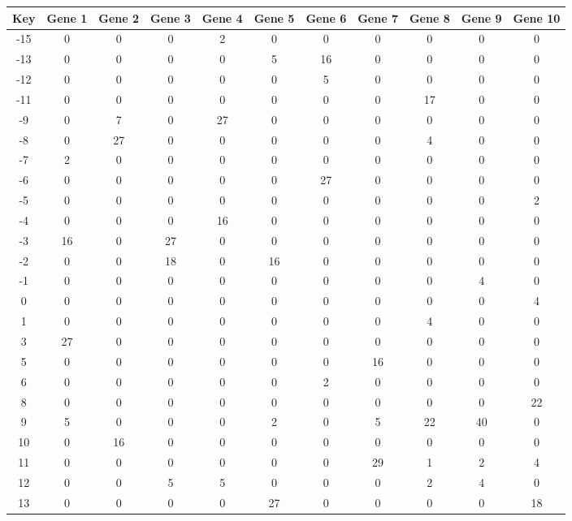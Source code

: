 \begin{tabular}{|c|c|c|c|c|c|c|c|c|c|c|}
\hline
Key & Gene 1 & Gene 2 & Gene 3 & Gene 4 & Gene 5 & Gene 6 & Gene 7 & Gene 8 & Gene 9 & Gene 10 \\
\hline
-15 & 0 & 0 & 0 & 2 & 0 & 0 & 0 & 0 & 0 & 0 \\
-13 & 0 & 0 & 0 & 0 & 5 & 16 & 0 & 0 & 0 & 0 \\
-12 & 0 & 0 & 0 & 0 & 0 & 5 & 0 & 0 & 0 & 0 \\
-11 & 0 & 0 & 0 & 0 & 0 & 0 & 0 & 17 & 0 & 0 \\
-9 & 0 & 7 & 0 & 27 & 0 & 0 & 0 & 0 & 0 & 0 \\
-8 & 0 & 27 & 0 & 0 & 0 & 0 & 0 & 4 & 0 & 0 \\
-7 & 2 & 0 & 0 & 0 & 0 & 0 & 0 & 0 & 0 & 0 \\
-6 & 0 & 0 & 0 & 0 & 0 & 27 & 0 & 0 & 0 & 0 \\
-5 & 0 & 0 & 0 & 0 & 0 & 0 & 0 & 0 & 0 & 2 \\
-4 & 0 & 0 & 0 & 16 & 0 & 0 & 0 & 0 & 0 & 0 \\
-3 & 16 & 0 & 27 & 0 & 0 & 0 & 0 & 0 & 0 & 0 \\
-2 & 0 & 0 & 18 & 0 & 16 & 0 & 0 & 0 & 0 & 0 \\
-1 & 0 & 0 & 0 & 0 & 0 & 0 & 0 & 0 & 4 & 0 \\
0 & 0 & 0 & 0 & 0 & 0 & 0 & 0 & 0 & 0 & 4 \\
1 & 0 & 0 & 0 & 0 & 0 & 0 & 0 & 4 & 0 & 0 \\
3 & 27 & 0 & 0 & 0 & 0 & 0 & 0 & 0 & 0 & 0 \\
5 & 0 & 0 & 0 & 0 & 0 & 0 & 16 & 0 & 0 & 0 \\
6 & 0 & 0 & 0 & 0 & 0 & 2 & 0 & 0 & 0 & 0 \\
8 & 0 & 0 & 0 & 0 & 0 & 0 & 0 & 0 & 0 & 22 \\
9 & 5 & 0 & 0 & 0 & 2 & 0 & 5 & 22 & 40 & 0 \\
10 & 0 & 16 & 0 & 0 & 0 & 0 & 0 & 0 & 0 & 0 \\
11 & 0 & 0 & 0 & 0 & 0 & 0 & 29 & 1 & 2 & 4 \\
12 & 0 & 0 & 5 & 5 & 0 & 0 & 0 & 2 & 4 & 0 \\
13 & 0 & 0 & 0 & 0 & 27 & 0 & 0 & 0 & 0 & 18 \\
\hline
\end{tabular}